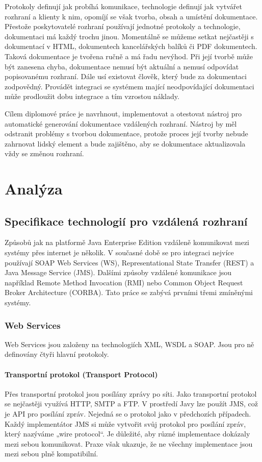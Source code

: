 \documentclass[11pt,twoside,a4paper]{book}
\begin{document}
Protokoly definují jak probíhá komunikace, technologie definují jak vytvářet rozhraní a
klienty k nim, opomíjí se však tvorba, obsah a umístění dokumentace. Přestože poskytovatelé
rozhraní používají jednotné protokoly a technologie, dokumentaci má každý trochu jinou.
Momentálně se můžeme setkat nejčastěji s dokumentací v HTML, dokumentech
kancelářských balíků či PDF dokumentech. Taková dokumentace je tvořena ručně a má řadu
nevýhod. Při její tvorbě může být zanesena chyba, dokumentace nemusí být aktuální a nemusí
odpovídat popisovanému rozhraní. Dále usí existovat člověk, který bude za dokumentaci
zodpovědný. Provádět integraci se systémem mající neodpovídající dokumentaci může
prodloužit dobu integrace a tím vzrostou náklady.

Cílem diplomové práce je navrhnout, implementovat a otestovat nástroj pro automatické
generování dokumentace vzdálených rozhraní. Nástroj by měl odstranit problémy s tvorbou
dokumentace, protože proces její tvorby nebude zahrnovat lidský element a bude zajištěno,
aby se dokumentace aktualizovala vždy se změnou rozhraní.

\chapter{Analýza}
\section{Specifikace technologií pro vzdálená rozhraní}
Způsobů jak na platformě Java Enterprise Edition vzdáleně komunikovat mezi systémy přes
internet je několik. V současné době se pro integraci nejvíce používají SOAP Web Services
(WS), Representational State Transfer (REST) a Java Message Service (JMS). Dalšími
způsoby vzdálené komunikace jsou například
Remote Method Invocation (RMI) nebo
Common Object Request Broker Architecture (CORBA). Tato práce se zabývá prvními třemi
zmíněnými systémy.


\subsection{Web Services}
Web Services jsou založeny na technologiích XML, WSDL a SOAP. Jsou pro ně
definovány čtyři hlavní protokoly.

\subsubsection{Transportní protokol (Transport Protocol)}
Přes transportní protokol jsou posílány zprávy po síti. Jako transportní protokol se nejčastěji
využívá HTTP, SMTP a FTP. V prostředí Javy lze použít JMS, což je API pro posílání zpráv.
Nejedná se o protokol jako v předchozích případech. Každý implementátor JMS si může
vytvořit svůj protokol pro posílání zpráv, který nazýváme „wire protocol“. Je důležité, aby
různé implementace dokázaly mezi sebou komunikovat. Praxe však ukazuje, že ne všechny
implementace jsou mezi sebou plně kompatibilní.
\end{document}
